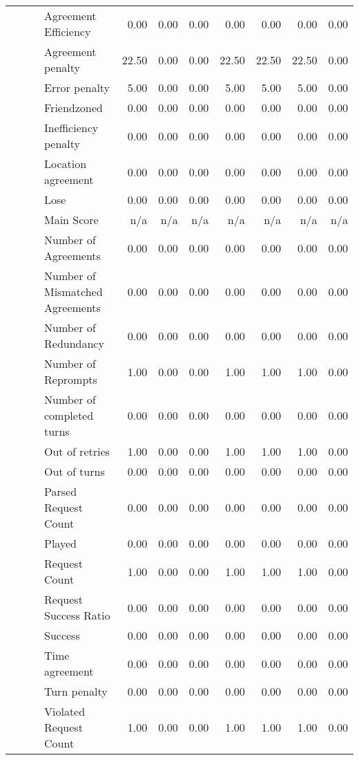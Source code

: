 \begin{tabular}{llllrrrrrrr}
 &  &  & Agreement Efficiency & 0.00 & 0.00 & 0.00 & 0.00 & 0.00 & 0.00 & 0.00 \\
 &  &  & Agreement penalty & 22.50 & 0.00 & 0.00 & 22.50 & 22.50 & 22.50 & 0.00 \\
 &  &  & Error penalty & 5.00 & 0.00 & 0.00 & 5.00 & 5.00 & 5.00 & 0.00 \\
 &  &  & Friendzoned & 0.00 & 0.00 & 0.00 & 0.00 & 0.00 & 0.00 & 0.00 \\
 &  &  & Inefficiency penalty & 0.00 & 0.00 & 0.00 & 0.00 & 0.00 & 0.00 & 0.00 \\
 &  &  & Location agreement & 0.00 & 0.00 & 0.00 & 0.00 & 0.00 & 0.00 & 0.00 \\
 &  &  & Lose & 0.00 & 0.00 & 0.00 & 0.00 & 0.00 & 0.00 & 0.00 \\
 &  &  & Main Score & n/a & n/a & n/a & n/a & n/a & n/a & n/a \\
 &  &  & Number of Agreements & 0.00 & 0.00 & 0.00 & 0.00 & 0.00 & 0.00 & 0.00 \\
 &  &  & Number of Mismatched Agreements & 0.00 & 0.00 & 0.00 & 0.00 & 0.00 & 0.00 & 0.00 \\
 &  &  & Number of Redundancy & 0.00 & 0.00 & 0.00 & 0.00 & 0.00 & 0.00 & 0.00 \\
 &  &  & Number of Reprompts & 1.00 & 0.00 & 0.00 & 1.00 & 1.00 & 1.00 & 0.00 \\
 &  &  & Number of completed turns & 0.00 & 0.00 & 0.00 & 0.00 & 0.00 & 0.00 & 0.00 \\
 &  &  & Out of retries & 1.00 & 0.00 & 0.00 & 1.00 & 1.00 & 1.00 & 0.00 \\
 &  &  & Out of turns & 0.00 & 0.00 & 0.00 & 0.00 & 0.00 & 0.00 & 0.00 \\
 &  &  & Parsed Request Count & 0.00 & 0.00 & 0.00 & 0.00 & 0.00 & 0.00 & 0.00 \\
 &  &  & Played & 0.00 & 0.00 & 0.00 & 0.00 & 0.00 & 0.00 & 0.00 \\
 &  &  & Request Count & 1.00 & 0.00 & 0.00 & 1.00 & 1.00 & 1.00 & 0.00 \\
 &  &  & Request Success Ratio & 0.00 & 0.00 & 0.00 & 0.00 & 0.00 & 0.00 & 0.00 \\
 &  &  & Success & 0.00 & 0.00 & 0.00 & 0.00 & 0.00 & 0.00 & 0.00 \\
 &  &  & Time agreement & 0.00 & 0.00 & 0.00 & 0.00 & 0.00 & 0.00 & 0.00 \\
 &  &  & Turn penalty & 0.00 & 0.00 & 0.00 & 0.00 & 0.00 & 0.00 & 0.00 \\
 &  &  & Violated Request Count & 1.00 & 0.00 & 0.00 & 1.00 & 1.00 & 1.00 & 0.00 \\

\end{tabular}
